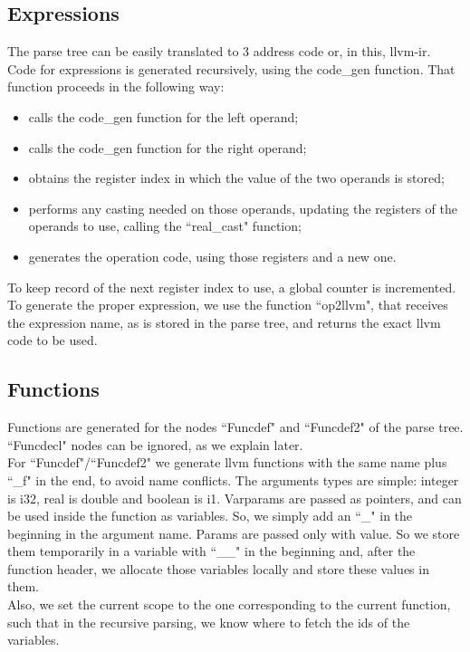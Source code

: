 \documentclass[12pt]{article}
\begin{document}
\subsection{Expressions}

The parse tree can be easily translated to 3 address code or, in this, llvm-ir. \\
Code for expressions is generated recursively, using the code\_gen function. That function proceeds in the following way:
\begin{itemize}
	\item calls the code\_gen function for the left operand;
	\item calls the code\_gen function for the right operand;
	\item obtains the register index in which the value of the two operands is stored;
	\item performs any casting needed on those operands, updating the registers of the operands to use, calling the ``real\_cast" function;
	\item generates the operation code, using those registers and a new one.
\end{itemize}

To keep record of the next register index to use, a global counter is incremented. \\
To generate the proper expression, we use the function ``op2llvm", that receives the expression name, as is stored in the parse tree, and returns the exact llvm code to be used.\\

\subsection{Functions}

Functions are generated for the nodes ``Funcdef" and ``Funcdef2" of the parse tree. ``Funcdecl" nodes can be ignored, as we explain later. \\
For ``Funcdef"/``Funcdef2" we generate llvm functions with the same name plus ``\_f" in the end, to avoid name conflicts. The arguments types are simple: integer is i32, real is double and boolean is i1. Varparams are passed as pointers, and can be used inside the function as variables. So, we simply add an ``\_" in the beginning in the argument name. Params are passed only with value. So we store them temporarily in a variable with ``\_\_" in the beginning and, after the function header, we allocate those variables locally and store these values in them. \\
Also, we set the current scope to the one corresponding to the current function, such that in the recursive parsing, we know where to fetch the ids of the variables.
\end{document}
